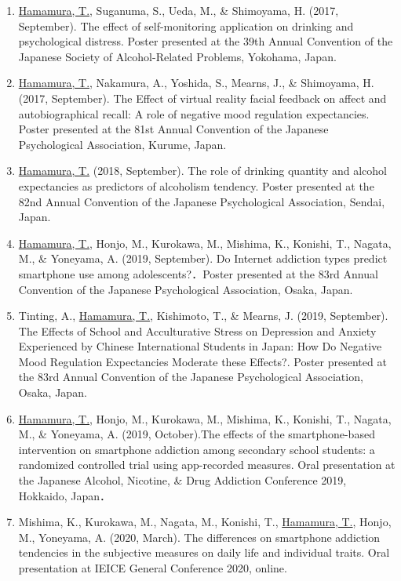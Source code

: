 \documentclass{article}
\begin{document}
\begin{enumerate}
	\item \underline{Hamamura, T.}, Suganuma, S., Ueda, M., \& Shimoyama, H. (2017, September). The effect of self-monitoring application on drinking and psychological distress. Poster presented at the 39th Annual Convention of the Japanese Society of Alcohol-Related Problems, Yokohama, Japan.
	\item \underline{Hamamura, T.}, Nakamura, A., Yoshida, S., Mearns, J., \& Shimoyama, H. (2017, September). The Effect of virtual reality facial feedback on affect and autobiographical recall: A role of negative mood regulation expectancies. Poster presented at the 81st Annual Convention of the Japanese Psychological Association, Kurume, Japan.
	\item \underline{Hamamura, T.} (2018, September). The role of drinking quantity and alcohol expectancies as predictors of alcoholism tendency. Poster presented at the 82nd Annual Convention of the Japanese Psychological Association, Sendai, Japan.
	\item \underline{Hamamura, T.}, Honjo, M., Kurokawa, M., Mishima, K., Konishi, T., Nagata, M., \& Yoneyama, A. (2019, September). Do Internet addiction types predict smartphone use among adolescents?．Poster presented at the 83rd Annual Convention of the Japanese Psychological Association, Osaka, Japan.
	\item Tinting, A., \underline{Hamamura, T.}, Kishimoto, T., \& Mearns, J. (2019, September). The Effects of School and Acculturative Stress on Depression and Anxiety Experienced by Chinese International Students in Japan: How Do Negative Mood Regulation Expectancies Moderate these Effects?. Poster presented at the 83rd Annual Convention of the Japanese Psychological Association, Osaka, Japan.
	\item \underline{Hamamura, T.}, Honjo, M., Kurokawa, M., Mishima, K., Konishi, T., Nagata, M., \& Yoneyama, A. (2019, October).The effects of the smartphone-based intervention on smartphone addiction among secondary school students: a randomized controlled trial using app-recorded measures. Oral presentation at the Japanese Alcohol, Nicotine, \& Drug Addiction Conference 2019, Hokkaido, Japan．
	\item Mishima, K., Kurokawa, M., Nagata, M., Konishi, T., \underline{Hamamura, T.}, Honjo, M., Yoneyama, A. (2020, March). The differences on smartphone addiction tendencies in the subjective measures on daily life and individual traits. Oral presentation at IEICE General Conference 2020, online.

\end{enumerate}
\end{document}
